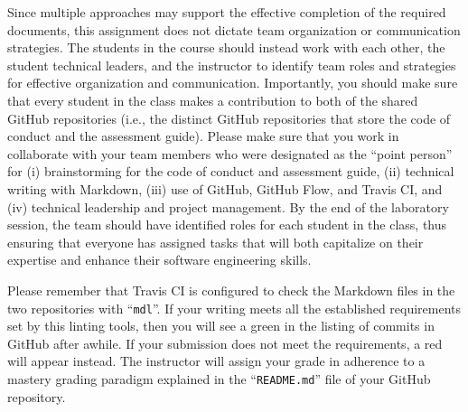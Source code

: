 \documentclass[11pt]{article}
\newcommand{\command}[1]{``\lstinline{#1}''}
\newcommand{\checkmark}{\ding{51}}
\newcommand{\naughtmark}{\ding{55}}
\begin{document}
Since multiple approaches may support the effective completion of the required
documents, this assignment does not dictate team organization or communication
strategies. The students in the course should instead work with each other, the
student technical leaders, and the instructor to identify team roles and
strategies for effective organization and communication. Importantly, you should
make sure that every student in the class makes a contribution to both of the
shared GitHub repositories (i.e., the distinct GitHub repositories that store
the code of conduct and the assessment guide).
%
Please make sure that you work in collaborate with your team members who were
designated as the ``point person'' for (i) brainstorming for the code of conduct
and assessment guide, (ii) technical writing with Markdown, (iii) use of GitHub,
GitHub Flow, and Travis CI, and (iv) technical leadership and project
management.
%
By the end of the laboratory session, the team should have identified roles for
each student in the class, thus ensuring that everyone has assigned tasks that
will both capitalize on their expertise and enhance their software engineering
skills.



Please remember that Travis CI is configured to check the Markdown files in the
two repositories with \command{mdl}.
%
If your writing meets all the established requirements set by this linting
tools, then you will see a green \checkmark{} in the listing of commits in
GitHub after awhile. If your submission does not meet the requirements, a red
\naughtmark{} will appear instead. The instructor will assign your grade in
adherence to a mastery grading paradigm explained in the \command{README.md}
file of your GitHub repository.
\end{document}
